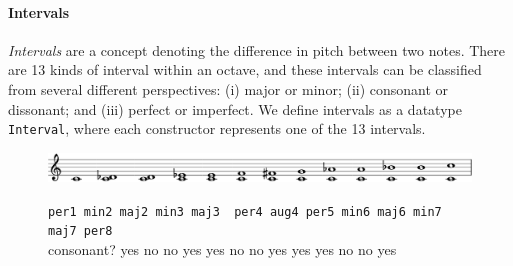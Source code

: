 \paragraph{Intervals}

\emph{Intervals} are a concept denoting the difference in pitch
between two notes.
There are 13 kinds of interval within an octave, and these intervals
can be classified from several different perspectives: (i) major or
minor; (ii) consonant or dissonant; and (iii) perfect or imperfect.
We define intervals as a datatype \texttt{Interval}, where each
constructor represents one of the 13 intervals.

\begin{figure}[h]
  \includegraphics[width=12cm]{fig/interval.png} \\
  \begin{flushleft}
    \begin{footnotesize}
      \hspace{1.45cm} \texttt{per1 \hspace{0.5mm} min2  \hspace{2.5mm}
        maj2 \hspace{1.2mm} min3 \hspace{0.5mm} maj3 \ per4
        \hspace{1mm}aug4
        \hspace{0.5mm}  per5\hspace{1.2mm}  min6\hspace{1.6mm} maj6
        \hspace{1.6mm}min7\hspace{1.2mm} maj7\hspace{1.2mm} per8} \\
      consonant? \hspace{1.5mm} yes \hspace{4.2mm} no \hspace{6.5mm}  no
      \hspace{4.7mm} yes \hspace{3.8mm}  yes \hspace{3.7mm} no \hspace{3.5mm}
      no \hspace{4.3mm} yes \hspace{3.8mm} yes \hspace{3.2mm} yes
      \hspace{3.7mm} no \hspace{4mm} no \hspace{3.8mm} yes
    \end{footnotesize}
  \end{flushleft}
\end{figure}